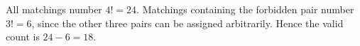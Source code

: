 All matchings number $4!=24$. Matchings containing the forbidden pair number $3!=6$, since the other three pairs can be assigned arbitrarily. Hence the valid count is $24-6=\boxed{18}$.

